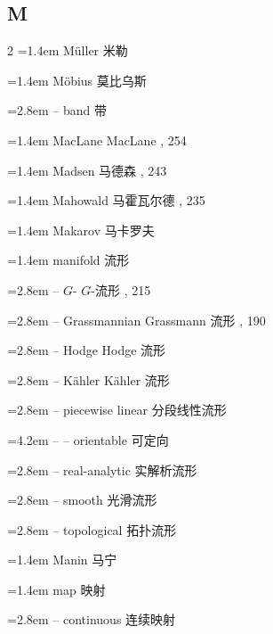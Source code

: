 \subsection*{M}
\small
\begin{multicols}{2}
\noindent\hangindent=1.4em M\"uller \quad 米勒 \par
\noindent\hangindent=1.4em M\"obius \quad 莫比乌斯 \par
\noindent\hangindent=2.8em -- band \quad 带 \par
\noindent\hangindent=1.4em MacLane \quad MacLane , 254\par
\noindent\hangindent=1.4em Madsen \quad 马德森 , 243\par
\noindent\hangindent=1.4em Mahowald \quad 马霍瓦尔德 , 235\par
\noindent\hangindent=1.4em Makarov \quad 马卡罗夫 \par
\noindent\hangindent=1.4em manifold \quad 流形 \par
\noindent\hangindent=2.8em -- $G$- \quad $G$-流形 , 215\par
\noindent\hangindent=2.8em -- Grassmannian \quad Grassmann 流形 , 190\par
\noindent\hangindent=2.8em -- Hodge \quad Hodge 流形 \par
\noindent\hangindent=2.8em -- K\"ahler \quad K\"ahler 流形 \par
\noindent\hangindent=2.8em -- piecewise linear \quad 分段线性流形 \par
\noindent\hangindent=4.2em -- -- orientable \quad 可定向 \par
\noindent\hangindent=2.8em -- real-analytic \quad 实解析流形 \par
\noindent\hangindent=2.8em -- smooth \quad 光滑流形 \par
\noindent\hangindent=2.8em -- topological \quad 拓扑流形 \par
\noindent\hangindent=1.4em Manin \quad 马宁 \par
\noindent\hangindent=1.4em map \quad 映射 \par
\noindent\hangindent=2.8em -- continuous \quad 连续映射 \par

\end{multicols}
